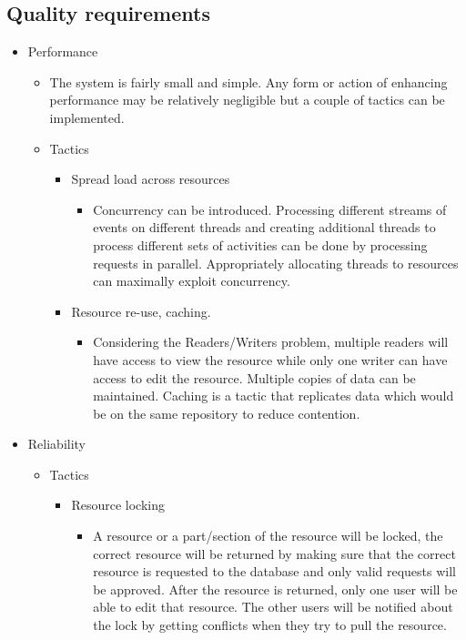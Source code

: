 \documentclass[a4paper,12pt]{article}
\begin{document}
	\subsection{Quality requirements}\label{subsec:quality}
	\begin{itemize}
		\item Performance
		\begin{itemize}
			\item The system is fairly small and simple. Any form or action of enhancing performance may be relatively negligible but a couple of tactics can be implemented. 
			
			\item Tactics
			\begin{itemize}
					\item Spread load across resources
						
						\begin{itemize}
							\item Concurrency can be introduced. Processing different streams of events on different threads and creating additional threads to process different sets of activities can be done by processing requests in parallel. Appropriately allocating threads to resources can maximally exploit concurrency. 
							
						\end{itemize}
					
					\item Resource re-use, caching.
					
						\begin{itemize}
							\item Considering the Readers/Writers problem, multiple readers will have access to view the resource while only one writer can have access to edit the resource. Multiple copies of data can be maintained. Caching is a tactic that replicates data which would be on the same repository to reduce contention.
						\end{itemize}
						
			\end{itemize}		
		\end{itemize}
		\item Reliability
		\begin{itemize}
			
			\item Tactics
			\begin{itemize}
				\item Resource locking
				
					\begin{itemize}
						\item A resource or a part/section of the resource will be locked, the correct resource will be returned by making sure that the correct resource is requested to the database and only valid requests will be approved. After the resource is returned, only one user will be able to edit that resource. The other users will be notified about the lock by getting conflicts when they try to pull the resource.
					\end{itemize}
										

\end{itemize}
\end{itemize}
\end{itemize}
\end{document}
